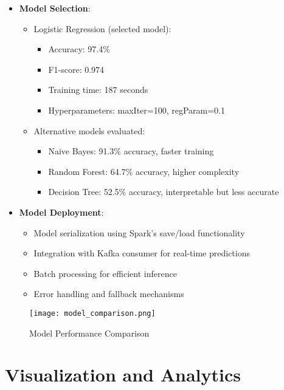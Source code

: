 \documentclass[11pt,a4paper,twocolumn]{article}
\begin{document}
\begin{itemize}
    \item \textbf{Model Selection}:
    \begin{itemize}
        \item Logistic Regression (selected model):
        \begin{itemize}
            \item Accuracy: 97.4\%
            \item F1-score: 0.974
            \item Training time: 187 seconds
            \item Hyperparameters: maxIter=100, regParam=0.1
        \end{itemize}
        \item Alternative models evaluated:
        \begin{itemize}
            \item Naive Bayes: 91.3\% accuracy, faster training
            \item Random Forest: 64.7\% accuracy, higher complexity
            \item Decision Tree: 52.5\% accuracy, interpretable but less accurate
        \end{itemize}
    \end{itemize}
    
    \item \textbf{Model Deployment}:
    \begin{itemize}
        \item Model serialization using Spark's save/load functionality
        \item Integration with Kafka consumer for real-time predictions
        \item Batch processing for efficient inference
        \item Error handling and fallback mechanisms
    \end{itemize}
\end{itemize}

\begin{figure}[H]
    \centering
    \texttt{[image: model\_comparison.png]}
    \caption{Model Performance Comparison}
    \label{fig:model_comparison}
\end{figure}

\section{Visualization and Analytics}
\end{document}
